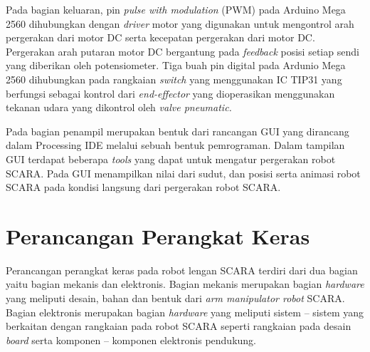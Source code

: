 Pada bagian keluaran, pin \textit{pulse with modulation} (PWM) pada Arduino Mega 2560 dihubungkan dengan \textit{driver} motor yang digunakan untuk mengontrol arah pergerakan dari motor DC serta kecepatan pergerakan dari motor DC. Pergerakan arah putaran motor DC bergantung pada \textit{feedback} posisi setiap sendi yang diberikan oleh potensiometer. Tiga buah pin digital pada Ardunio Mega 2560 dihubungkan pada rangkaian \textit{switch} yang menggunakan IC TIP31 yang berfungsi sebagai kontrol dari \textit{end-effector} yang dioperasikan menggunakan tekanan udara yang dikontrol oleh \textit{valve pneumatic.}

Pada bagian penampil merupakan bentuk dari rancangan GUI yang dirancang dalam Processing IDE melalui sebuah bentuk pemrograman. Dalam tampilan GUI terdapat beberapa \textit{tools} yang dapat untuk mengatur pergerakan robot SCARA. Pada GUI menampilkan nilai dari sudut, dan posisi serta animasi robot SCARA pada kondisi langsung dari pergerakan robot SCARA.
\section{ Perancangan Perangkat Keras }
Perancangan perangkat keras pada robot lengan SCARA terdiri dari dua bagian yaitu bagian mekanis dan elektronis. Bagian  mekanis merupakan bagian \textit{hardware} yang meliputi desain, bahan dan bentuk dari\textit{ arm manipulator robot} SCARA. Bagian elektronis merupakan bagian \textit{hardware} yang meliputi sistem – sistem yang berkaitan dengan rangkaian pada robot SCARA seperti rangkaian pada desain \textit{board} serta komponen – komponen elektronis pendukung.
